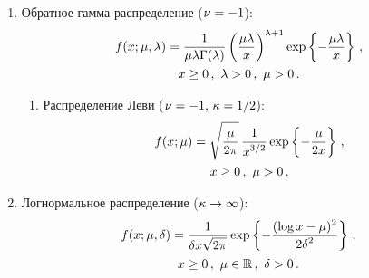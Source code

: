 \begin{multicols}{2}
\begin{enumerate}[1.]
\item Обратное гамма-распределение ($\nu\hm=-1$):
\begin{multline*}
f(x;\mu,\lambda)=\fr{1}{\mu\lambda\Gamma(\lambda)}\left(\fr{\mu\lambda}{x}\right)^{\lambda+1}
\exp\left\{-\fr{\mu\lambda}{x}\right\}\,,\\
 x\ge0\,, \ \lambda>0\,,\ \mu>0\,.
\end{multline*}
\begin{enumerate}[{4}.1]
\item Распределение Леви ($\nu\hm=-1,\, \kappa\hm=1/2$):
\begin{multline*}
f(x;\mu)=\sqrt{\fr{\mu}{2\pi}}\,\fr{1}{x^{3/2}}\exp\left\{-\fr{\mu}{2x}\right\}\,,\\
 x\ge0\,, \ \mu>0\,.
\end{multline*}
\end{enumerate}

\item Логнормальное распределение ($\kappa\hm\to\infty$):
\begin{multline*}
f(x;\mu,\delta)=\fr{1}{\delta x\sqrt{2\pi}}\exp\left\{-\fr{(\log x-\mu)^2}{2\delta^2}\right\}\,,\\
x\ge0\,, \ \mu\in\mathbb{R}\,,\ \delta>0\,.
\end{multline*}
\end{enumerate}


\end{multicols}
